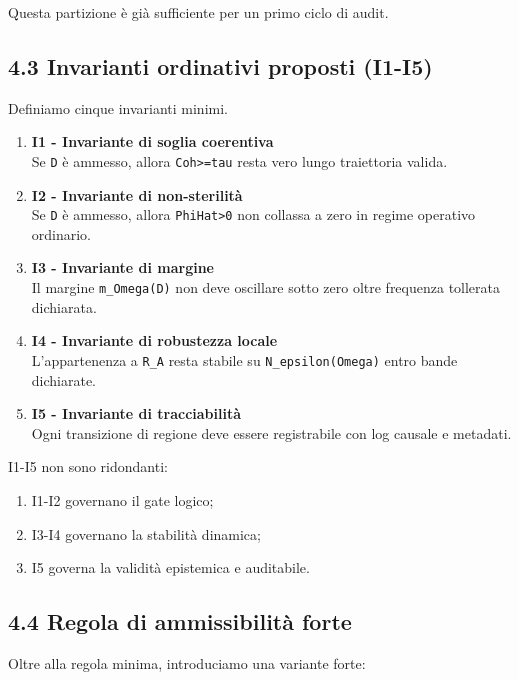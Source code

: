 Questa partizione è già sufficiente per un primo ciclo di audit.

\subsection{4.3 Invarianti ordinativi proposti (I1-I5)}

Definiamo cinque invarianti minimi.

\begin{enumerate}
\def\labelenumi{\arabic{enumi}.}
\item
  \textbf{I1 - Invariante di soglia coerentiva}\\
  Se \texttt{D} è ammesso, allora \texttt{Coh\textgreater{}=tau} resta vero lungo traiettoria valida.
\item
  \textbf{I2 - Invariante di non-sterilità}\\
  Se \texttt{D} è ammesso, allora \texttt{PhiHat\textgreater{}0} non collassa a zero in regime operativo ordinario.
\item
  \textbf{I3 - Invariante di margine}\\
  Il margine \texttt{m\_Omega(D)} non deve oscillare sotto zero oltre frequenza tollerata dichiarata.
\item
  \textbf{I4 - Invariante di robustezza locale}\\
  L'appartenenza a \texttt{R\_A} resta stabile su \texttt{N\_epsilon(Omega)} entro bande dichiarate.
\item
  \textbf{I5 - Invariante di tracciabilità}\\
  Ogni transizione di regione deve essere registrabile con log causale e metadati.
\end{enumerate}

I1-I5 non sono ridondanti:

\begin{enumerate}
\def\labelenumi{\arabic{enumi}.}
\tightlist
\item
  I1-I2 governano il gate logico;
\item
  I3-I4 governano la stabilità dinamica;
\item
  I5 governa la validità epistemica e auditabile.
\end{enumerate}

\subsection{4.4 Regola di ammissibilità forte}

Oltre alla regola minima, introduciamo una variante forte:

